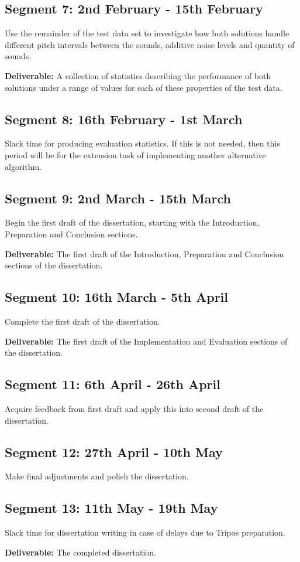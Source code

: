 \documentclass[12pt,a4paper,twoside,openright]{report}
\begin{document}
\subsection*{Segment 7: 2nd February - 15th February}

Use the remainder of the test data set to investigate how both solutions handle different pitch intervals between the sounds, additive noise levels and quantity of sounds.

\textbf{Deliverable:} A collection of statistics describing the performance of both solutions under a range of values for each of these properties of the test data.

\subsection*{Segment 8: 16th February - 1st March}

Slack time for producing evaluation statistics. If this is not needed, then this period will be for the extension task of implementing another alternative algorithm.

\subsection*{Segment 9: 2nd March - 15th March}

Begin the first draft of the dissertation, starting with the Introduction, Preparation and Conclusion sections.

\textbf{Deliverable:} The first draft of the Introduction, Preparation and Conclusion sections of the dissertation.

\subsection*{Segment 10: 16th March - 5th April}

Complete the first draft of the dissertation.

\textbf{Deliverable:} The first draft of the Implementation and Evaluation sections of the dissertation.

\subsection*{Segment 11: 6th April - 26th April}

Acquire feedback from first draft and apply this into second draft of the dissertation.

\subsection*{Segment 12: 27th April - 10th May}

Make final adjustments and polish the dissertation.

\subsection*{Segment 13: 11th May - 19th May}

Slack time for dissertation writing in case of delays due to Tripos preparation.

\textbf{Deliverable:} The completed dissertation.
\end{document}
